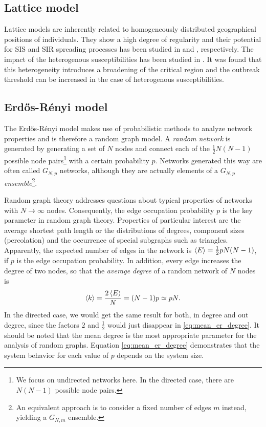 \subsection{Lattice model}
Lattice models are inherently related to homogeneously distributed geographical positions of individuals.
They show a high degree of regularity and their potential for SIS and SIR spreading processes has been studied in \citep{Harris:1974} and \citep{Bak:1990}, respectively.
The impact of the heterogenous susceptibilities has been studied in \citep{Sander2002293}.
It was found that this heterogeneity introduces a broadening of the critical region and the outbreak threshold can be increased in the case of heterogenous susceptibilities.


\subsection{Erd\H{o}s-R\'enyi model}\label{sec:er_model}
The Erd\H{o}s-R\'enyi model makes use of probabilistic methods to analyze network properties and is therefore a random graph model.
A \emph{random network} is generated by generating a set of $N$ nodes and connect each of the $\frac{1}{2}N(N-1)$ possible node pairs\footnote{We focus on undirected networks here. In the directed case, there are $N(N-1)$ possible node pairs.} with a certain probability $p$.
Networks generated this way are often called $G_{N,p}$ networks, although they are actually elements of a $G_{N,p}$ \emph{ensemble}\footnote{An equivalent approach is to consider a fixed number of edges $m$ instead, yielding a $G_{N,m}$ ensemble.}.

Random graph theory addresses questions about typical properties of networks with $N\rightarrow \infty $ nodes.
Consequently, the edge occupation probability $p$ is the key parameter in random graph theory.
Properties of particular interest are the average shortest path length or the distributions of degrees, component sizes (percolation) and the occurrence of special subgraphs such as triangles.
Apparently, the expected number of edges in the network is $\left< E \right>=\frac{1}{2}pN(N-1)$, if $p$ is the edge occupation probability.
In addition, every edge increases the degree of two nodes, so that the \emph{average degree} of a random network of $N$ nodes is
\begin{equation}\label{eq:mean_er_degree}
\left< k \right>=\frac{2\left< E \right>}{N}=(N-1)p\simeq pN .
\end{equation}
In the directed case, we would get the same result for both, in degree and out degree, since the factors $2$ and $\frac{1}{2}$ would just disappear in \eqref{eq:mean_er_degree}.
It should be noted that the mean degree is the most appropriate parameter for the analysis of random graphs.
Equation \eqref{eq:mean_er_degree} demonstrates that the system behavior for each value of $p$ depends on the system size.


